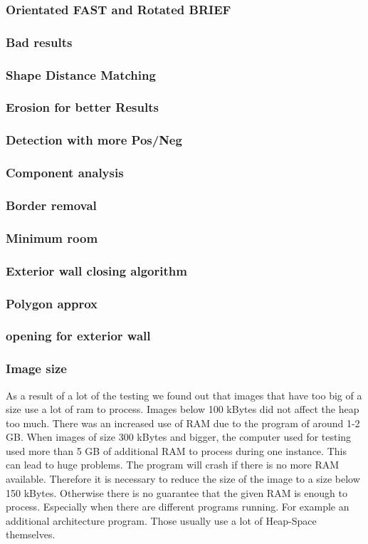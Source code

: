 \subsubsection{Orientated FAST and Rotated BRIEF}
\subsubsection{Bad results}
\subsubsection{Shape Distance Matching}
\subsubsection{Erosion for better Results}
\subsubsection{Detection with more Pos/Neg}
\subsubsection{Component analysis}
\subsubsection{Border removal}
\subsubsection{Minimum room}
\subsubsection{Exterior wall closing algorithm}
\subsubsection{Polygon approx}
\subsubsection{opening for exterior wall}
\subsubsection{Image size}
As a result of a lot of the testing we found out that images that have too big of a size use a lot of ram to process. Images below 100 kBytes did not affect the heap too much. There was an increased use of RAM due to the program of around 1-2 GB. When images of size 300 kBytes and bigger, the computer used for testing used more than 5 GB of additional RAM to process during one instance. This can lead to huge problems. The program will crash if there is no more RAM available. Therefore it is necessary to reduce the size of the image to a size below 150 kBytes. Otherwise there is no guarantee that the given RAM is enough to process. Especially when there are different programs running. For example an additional architecture program. Those usually use a lot of Heap-Space themselves. 

